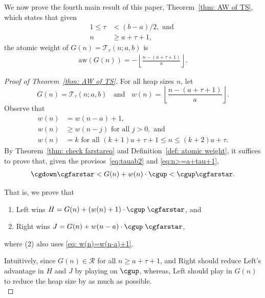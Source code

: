 \documentclass[oneside,reqno]{amsart}
\newcommand{\ts}{\mathcal{T}}
\newcommand{\aw}{\mathrm{aw}}
\newcommand{\rp}{\mathscr{R}}
\begin{document}
We now prove the fourth main result of this paper, Theorem~\ref{thm: AW of TS}, which states that given \begin{align}
1\le \tau&<(b-a)/2, \text{ and } \label{eq:tauab2} \\
n&\ge a+\tau+1, \label{eq:n>=a+tau+1}
\end{align} the atomic weight of $G(n)=\ts_\tau(n;a,b)$ is 
\begin{align*}
    \aw(G(n)) =-\left\lfloor \frac{n-(a+\tau+1)}{a}\right\rfloor.
\end{align*}

\begin{proof}[Proof of Theorem~\ref{thm: AW of TS}]
   For all heap sizes $n$, let $$G(n)=\ts_\tau(n;a,b)\;\; \text{ and } \;\;w(n)=\left\lfloor \frac{n-(a+\tau+1)}{a}\right\rfloor.$$ 
   Observe that 
   \begin{align}
        w(n)&=w(n-a)+1,\label{eq: w(n)=w(n-a)+1}\;\;\\
        w(n)&\ge w(n-j) \text { for all } j>0\label{eq: w(n)>w(n-j)},\text{ and }\\
        w(n)&=k \text{ for all } (k+1)a+\tau+1\le n\le (k+2)a+\tau. \label{eq: compute w(n)}
    \end{align} 
    By Theorem~\ref{thm: check farstareq} and Definition~\ref{def: atomic weight}, it suffices to prove that, given the provisos~\eqref{eq:tauab2} and \eqref{eq:n>=a+tau+1},
    \begin{align}    
        \cgdown\cgfarstar<G(n)+w(n)\cdot\cgup<\cgup\cgfarstar.
    \end{align}

    That is, we prove that 
    \begin{enumerate}
        \item Left wins $H=G(n)+(w(n)+1)\cdot\cgup\;\cgfarstar$, and
        \item Right wins $J=G(n)+w(n-a)\cdot\cgup\;\cgfarstar$,
    \end{enumerate}
    where (2) also uses \eqref{eq: w(n)=w(n-a)+1}. 
    

    Intuitively, since $G(n)\in \rp$ for all $n\ge a+\tau+1$, and Right should reduce Left's advantage in $H$ and $J$ by playing on $\cgup$, whereas, Left should play in $G(n)$ to reduce the heap size by as much as possible.\\ 
    

\end{proof}
\end{document}
